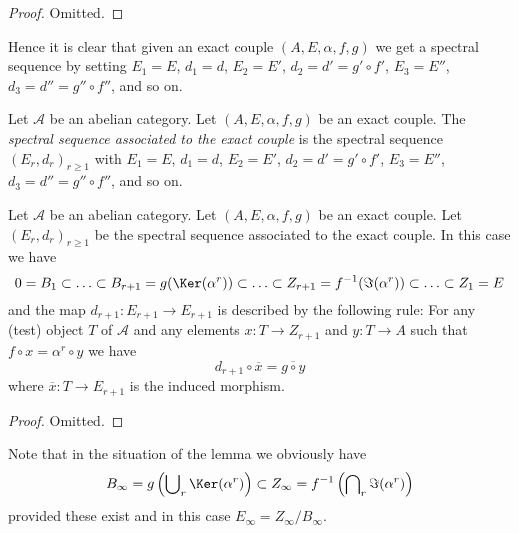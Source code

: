 \begin{proof}
Omitted.
\end{proof}

\noindent
Hence it is clear that given an exact couple $(A, E, \alpha, f, g)$
we get a spectral sequence by setting $E_1 = E$, $d_1 = d$,
$E_2 = E'$, $d_2 = d' = g' \circ f'$, $E_3 = E''$, $d_3 = d'' = g'' \circ f''$,
and so on.

\begin{definition}
\label{definition-spectral-sequence-associated-exact-couple}
Let $\mathcal{A}$ be an abelian category.
Let $(A, E, \alpha, f, g)$ be an exact couple.
The {\it spectral sequence associated to the exact couple}
is the spectral sequence $(E_r, d_r)_{r \geq 1}$ with
$E_1 = E$, $d_1 = d$, $E_2 = E'$, $d_2 = d' = g' \circ f'$,
$E_3 = E''$, $d_3 = d'' = g'' \circ f''$,
and so on.
\end{definition}

\begin{lemma}
\label{lemma-spectral-sequence-associated-exact-couple}
Let $\mathcal{A}$ be an abelian category.
Let $(A, E, \alpha, f, g)$ be an exact couple.
Let $(E_r, d_r)_{r \geq 1}$ be the spectral sequence
associated to the exact couple.
In this case we have
$$
0 = B_1 \subset \ldots \subset
B_{r + 1} = g(\Ker(\alpha^r))
\subset \ldots \subset
Z_{r + 1} = f^{-1}(\Im(\alpha^r))
\subset \ldots \subset Z_1 = E
$$
and the map $d_{r + 1} : E_{r + 1} \to E_{r + 1}$
is described by the following rule:
For any (test) object $T$ of $\mathcal{A}$ and any elements
$x : T \to Z_{r + 1}$ and $y : T \to A$ such that
$f \circ x = \alpha^r \circ y$ we have
$$
d_{r + 1} \circ \overline{x} = \overline{g \circ y}
$$
where $\overline{x} : T \to E_{r + 1}$ is the
induced morphism.
\end{lemma}

\begin{proof}
Omitted.
\end{proof}

\noindent
Note that in the situation of the lemma we obviously have
$$
B_\infty = g\left(\bigcup\nolimits_r \Ker(\alpha^r)\right)
\subset
Z_\infty = f^{-1}\left(\bigcap\nolimits_r \Im(\alpha^r)\right)
$$
provided these exist and in this case $E_\infty = Z_\infty / B_\infty$.

